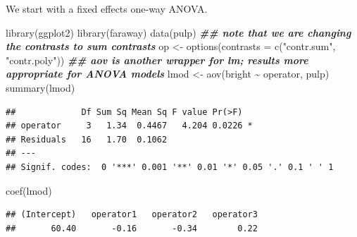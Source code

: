 \documentclass[
  ignorenonframetext,
]{beamer}
\newenvironment{Shaded}{\begin{snugshade}}{\end{snugshade}}
\newcommand{\AttributeTok}[1]{\textcolor[rgb]{0.77,0.63,0.00}{#1}}
\newcommand{\DocumentationTok}[1]{\textcolor[rgb]{0.56,0.35,0.01}{\textbf{\textit{#1}}}}
\newcommand{\FunctionTok}[1]{\textcolor[rgb]{0.00,0.00,0.00}{#1}}
\newcommand{\NormalTok}[1]{#1}
\newcommand{\OtherTok}[1]{\textcolor[rgb]{0.56,0.35,0.01}{#1}}
\newcommand{\SpecialCharTok}[1]{\textcolor[rgb]{0.00,0.00,0.00}{#1}}
\newcommand{\StringTok}[1]{\textcolor[rgb]{0.31,0.60,0.02}{#1}}
\begin{document}
\begin{frame}[fragile]{}
\protect\hypertarget{section}{}
We start with a fixed effects one-way ANOVA.

\vspace{12pt}
\tiny

\begin{Shaded}
\begin{Highlighting}[]
\FunctionTok{library}\NormalTok{(ggplot2)}
\FunctionTok{library}\NormalTok{(faraway)}
\FunctionTok{data}\NormalTok{(pulp)}
\DocumentationTok{\#\# note that we are changing the contrasts to sum contrasts}
\NormalTok{op }\OtherTok{\textless{}{-}} \FunctionTok{options}\NormalTok{(}\AttributeTok{contrasts =} \FunctionTok{c}\NormalTok{(}\StringTok{"contr.sum"}\NormalTok{, }\StringTok{"contr.poly"}\NormalTok{))}
\DocumentationTok{\#\# aov is another wrapper for lm; results more appropriate for ANOVA models}
\NormalTok{lmod }\OtherTok{\textless{}{-}} \FunctionTok{aov}\NormalTok{(bright }\SpecialCharTok{\textasciitilde{}}\NormalTok{ operator, pulp)}
\FunctionTok{summary}\NormalTok{(lmod)}
\end{Highlighting}
\end{Shaded}

\begin{verbatim}
##             Df Sum Sq Mean Sq F value Pr(>F)  
## operator     3   1.34  0.4467   4.204 0.0226 *
## Residuals   16   1.70  0.1062                 
## ---
## Signif. codes:  0 '***' 0.001 '**' 0.01 '*' 0.05 '.' 0.1 ' ' 1
\end{verbatim}

\begin{Shaded}
\begin{Highlighting}[]
\FunctionTok{coef}\NormalTok{(lmod)}
\end{Highlighting}
\end{Shaded}

\begin{verbatim}
## (Intercept)   operator1   operator2   operator3 
##       60.40       -0.16       -0.34        0.22
\end{verbatim}
\end{frame}
\end{document}
